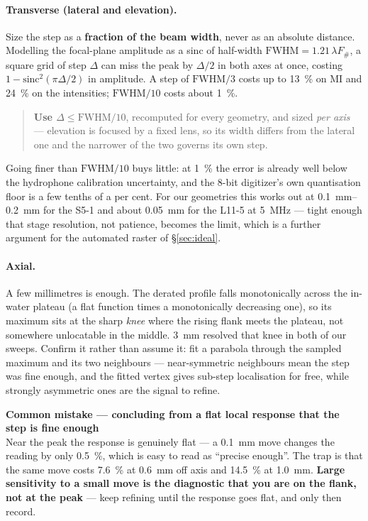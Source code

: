 \documentclass[11pt,a4paper]{article}
\newcommand{\good}[1]{\textcolor{green!45!black}{\textbf{#1}}}
\newcommand{\mistaketitle}[1]{\textcolor{orange!75!black}{\textbf{Common mistake --- #1}}\\[2pt]}
\begin{document}
\paragraph{Transverse (lateral and elevation).} Size the step as a \textbf{fraction of the beam
width}, never as an absolute distance. Modelling the focal-plane amplitude as a sinc of half-width
$\mathrm{FWHM}=1.21\,\lambda F_\#$, a square grid of step $\Delta$ can miss the peak by $\Delta/2$ in
both axes at once, costing $1-\mathrm{sinc}^2(\pi\Delta/2)$ in amplitude. A step of
$\mathrm{FWHM}/3$ costs up to \SI{13}{\percent} on MI and \SI{24}{\percent} on the intensities;
$\mathrm{FWHM}/10$ costs about \SI{1}{\percent}.

\begin{quote}
\textbf{Use $\Delta \le \mathrm{FWHM}/10$}, recomputed for every geometry, and sized \emph{per axis}
--- elevation is focused by a fixed lens, so its width differs from the lateral one and the narrower
of the two governs its own step.
\end{quote}

\noindent
Going finer than $\mathrm{FWHM}/10$ buys little: at \SI{1}{\percent} the error is already well below
the hydrophone calibration uncertainty, and the 8-bit digitizer's own quantisation floor is a few
tenths of a per cent. For our geometries this works out at \SIrange{0.1}{0.2}{\milli\metre} for the
S5-1 and about \SI{0.05}{\milli\metre} for the L11-5 at \SI{5}{\mega\hertz} --- tight enough that
stage resolution, not patience, becomes the limit, which is a further argument for the automated
raster of \S\ref{sec:ideal}.

\paragraph{Axial.} A few millimetres is enough. The derated profile falls monotonically across the
in-water plateau (a flat function times a monotonically decreasing one), so its maximum sits at the
sharp \emph{knee} where the rising flank meets the plateau, not somewhere unlocatable in the middle.
\SI{3}{\milli\metre} resolved that knee in both of our sweeps. Confirm it rather than assume it: fit
a parabola through the sampled maximum and its two neighbours --- near-symmetric neighbours mean the
step was fine enough, and the fitted vertex gives sub-step localisation for free, while strongly
asymmetric ones are the signal to refine.

\begin{mistake}
\mistaketitle{concluding from a flat local response that the step is fine enough}
Near the peak the response is genuinely flat --- a \SI{0.1}{\milli\metre} move changes the reading by
only \SI{0.5}{\percent}, which is easy to read as ``precise enough''. The trap is that the same move
costs \SI{7.6}{\percent} at \SI{0.6}{\milli\metre} off axis and \SI{14.5}{\percent} at
\SI{1.0}{\milli\metre}. \good{Large sensitivity to a small move is the diagnostic that you are on the
flank, not at the peak} --- keep refining until the response goes flat, and only then record.
\end{mistake}
\end{document}
